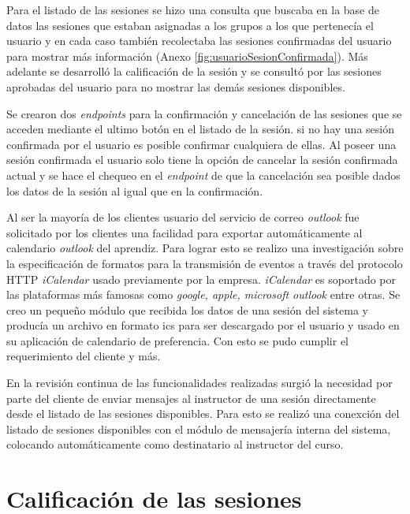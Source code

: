 	Para el listado de las sesiones se hizo una consulta que buscaba en la base de datos las sesiones que estaban asignadas a los grupos a los que pertenecía el usuario y en cada caso también recolectaba las sesiones confirmadas del usuario para mostrar más información (Anexo \ref{fig:usuarioSesionConfirmada}). Más adelante se desarrolló la calificación de la sesión y se consultó por las sesiones aprobadas del usuario para no mostrar las demás sesiones disponibles.

	Se crearon dos \emph{endpoints} para la confirmación y cancelación de las sesiones que se acceden mediante el ultimo botón en el listado de la sesión. si no hay una sesión confirmada por el usuario es posible confirmar cualquiera de ellas. Al poseer una sesión confirmada el usuario solo tiene la opción de cancelar la sesión confirmada actual y se hace el chequeo en el \emph{endpoint} de que la cancelación sea posible dados los datos de la sesión al igual que en la confirmación.

	Al ser la mayoría de los clientes usuario del servicio de correo \emph{outlook} fue solicitado por los clientes una facilidad para exportar automáticamente al calendario \emph{outlook} del aprendiz. Para lograr esto se realizo una investigación sobre la especificación de formatos para la transmisión de eventos a través del protocolo \gls{HTTP} \emph{iCalendar} usado previamente por la empresa. \emph{iCalendar} es soportado por las plataformas más famosas como \emph{google, apple, microsoft outlook} entre otras. Se creo un pequeño módulo que recibida los datos de una sesión del sistema y producía un archivo en formato ics para ser descargado por el usuario y usado en su aplicación de calendario de preferencia. Con esto se pudo cumplir el requerimiento del cliente y más.

	En la revisión continua de las funcionalidades realizadas surgió la necesidad por parte del cliente de enviar mensajes al instructor de una sesión directamente desde el listado de las sesiones disponibles. Para esto se realizó una conexción del listado de sesiones disponibles con el módulo de mensajería interna del sistema, colocando automáticamente como destinatario al instructor del curso.

	\section{Calificación de las sesiones} %
	\label{sec:calificacion_de_las_sesiones}
	
